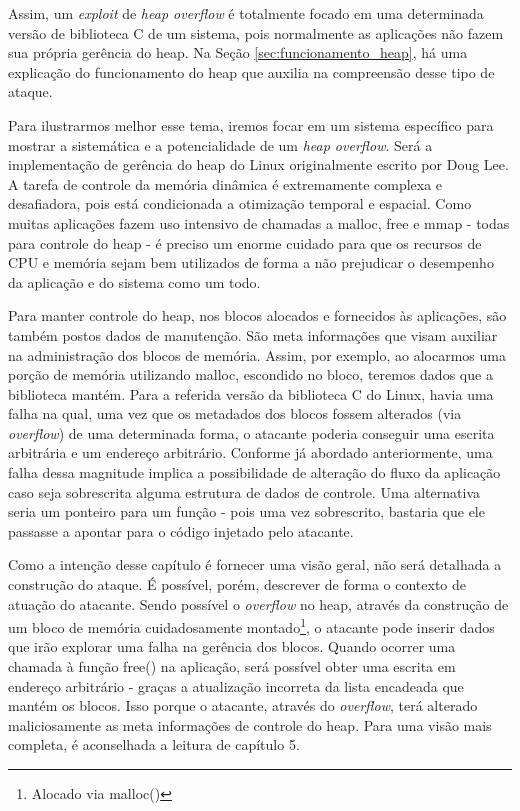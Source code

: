 			
			Assim, um \textsl{exploit} de \textsl{heap overflow} é totalmente focado
			em uma determinada versão de biblioteca C de um sistema, pois normalmente as aplicações
			não fazem sua própria gerência do heap. Na Seção \ref{sec:funcionamento_heap}, há
			uma explicação do funcionamento do heap que auxilia na compreensão desse tipo de ataque.
			

			Para ilustrarmos melhor esse tema, iremos focar em um sistema específico
			para mostrar a sistemática e a potencialidade de um \textsl{heap overflow}.
			Será a implementação de gerência do heap do Linux originalmente escrito por Doug Lee.
			A tarefa de controle da memória dinâmica é extremamente complexa e desafiadora, pois
			está condicionada a otimização temporal e espacial. Como muitas aplicações fazem
			uso intensivo de chamadas a malloc, free e mmap - todas para controle do heap - é preciso 
			um enorme cuidado para que os recursos de CPU e memória sejam bem utilizados de forma
			a não prejudicar o desempenho da aplicação e do sistema como um todo.


			Para manter controle do heap, nos blocos alocados e fornecidos às aplicações,
			são também postos dados de manutenção. São meta informações que visam auxiliar
			na administração dos blocos de memória. Assim, por exemplo, ao alocarmos uma porção
			de memória utilizando malloc, escondido no bloco, teremos dados que a biblioteca
			mantém.	Para a referida versão da biblioteca C do Linux, havia uma falha na qual, 
			uma vez que os metadados dos blocos fossem alterados (via \textsl{overflow}) de uma
			determinada forma, o atacante poderia conseguir uma escrita arbitrária e um endereço arbitrário.
			Conforme já abordado anteriormente, uma falha dessa magnitude implica a possibilidade
			de alteração do fluxo da aplicação caso seja sobrescrita alguma estrutura de dados de controle.
			Uma alternativa seria um ponteiro para um função - pois uma vez sobrescrito, bastaria
			que ele passasse a apontar para o código injetado pelo atacante.


			Como a intenção desse capítulo é fornecer uma visão geral, não será detalhada
			a construção do ataque. É possível, porém, descrever de forma o contexto de atuação
			do atacante.
			Sendo possível o \textsl{overflow} no heap, através da construção de um bloco
			de memória cuidadosamente montado\footnote{Alocado via malloc()}, 
			o atacante pode inserir dados que irão explorar uma falha na gerência dos blocos.
			Quando ocorrer uma chamada à função free() na aplicação, será possível obter uma escrita
			em endereço arbitrário - graças a atualização incorreta da lista encadeada que mantém os blocos.
			Isso porque o atacante, através do \textsl{overflow}, terá alterado maliciosamente
			as meta informações de controle do heap.
			Para uma visão mais completa, é aconselhada a leitura de \cite{Anley2007} capítulo 5.
			 

